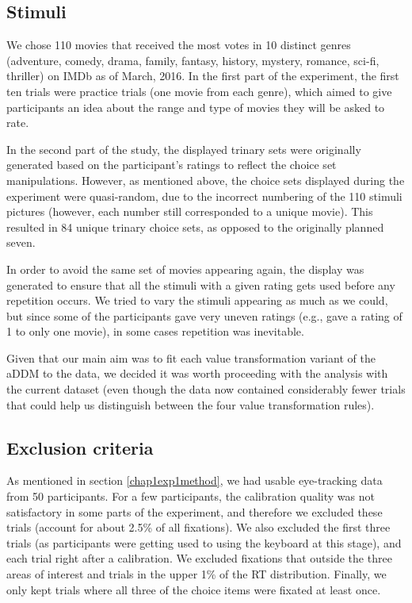 \documentclass[11pt,a4paper]{article}
\begin{document}
\subsection{Stimuli}

We chose 110 movies that received the most votes in 10 distinct genres (adventure, comedy, drama, family, fantasy, history, mystery, romance, sci-fi, thriller) on IMDb as of March, 2016. In the first part of the experiment, the first ten trials were practice trials (one movie from each genre), which aimed to give participants an idea about the range and type of movies they will be asked to rate. 

In the second part of the study, the displayed trinary sets were originally generated based on the participant's ratings to reflect the choice set manipulations. However, as mentioned above, the choice sets displayed during the experiment were quasi-random, due to the incorrect numbering of the 110 stimuli pictures (however, each number still corresponded to a unique movie). This resulted in 84 unique trinary choice sets, as opposed to the originally planned seven. 

In order to avoid the same set of movies appearing again, the display was generated to ensure that all the stimuli with a given rating gets used before any repetition occurs. We tried to vary the stimuli appearing as much as we could, but since some of the participants gave very uneven ratings (e.g., gave a rating of 1 to only one movie), in some cases repetition was inevitable. 

Given that our main aim was to fit each value transformation variant of the aDDM to the data, we decided it was worth proceeding with the analysis with the current dataset (even though the data now contained considerably fewer trials that could help us distinguish between the four value transformation rules). 

\subsection{Exclusion criteria}

As mentioned in section  \ref{chap1exp1method}, we had usable eye-tracking data from 50 participants. For a few participants, the calibration quality was not satisfactory in some parts of the experiment, and therefore we excluded these trials (account for about 2.5\% of all fixations). We also excluded the first three trials (as participants were getting used to using the keyboard at this stage), and each trial right after a calibration. We excluded fixations that outside the three areas of interest and trials in the upper 1\% of the RT distribution. Finally, we only kept trials where all three of the choice items were fixated at least once. 
\end{document}
